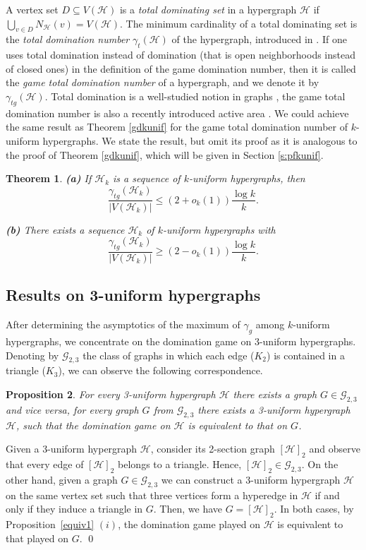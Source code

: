 \documentclass[12pt]{article}
\newtheorem{theorem}{Theorem}[section]
\newtheorem{prop}[theorem]{Proposition}
\newcommand\cG{{\mathcal G}}
\newcommand\cH{{\mathcal H}}
\begin{document}
\medskip

\noindent
A vertex set $D \subseteq V(\cH)$ is a \textit{total dominating set} in a hypergraph $\cH$ if $\bigcup_{v\in D} N_\cH(v)=V(\cH)$. The minimum cardinality of a total dominating set is the \textit{total domination number} $\gamma_t(\cH)$ of the hypergraph, introduced in \cite{BHT2014}. If one uses total domination instead of domination (that is open neighborhoods instead of closed ones) in the definition of the game domination number, then it is called the \textit{game total domination number} of a hypergraph, and we denote it by $\gamma_{tg}(\cH)$. Total domination is a well-studied  notion in graphs \cite{HY2013}, the game total domination number is also a recently introduced \cite{HKR2015} active area \cite{B2017, DH-2016, HKR2017}. We could achieve the same result as Theorem \ref{gdkunif} for the game total domination number of $k$-uniform hypergraphs. We state the result, but omit its proof as it is analogous to the proof of Theorem \ref{gdkunif}, which will be given in Section \ref{s:pfkunif}.

\begin{theorem}
\textbf{(a)} If $\cH_k$ is a sequence of $k$-uniform hypergraphs, then $$\frac{\gamma_{tg}(\cH_k)}{|V(\cH_k)|}\le (2+o_k(1))\frac{\log k}{k}.$$

\textbf{(b)} There exists a sequence $\cH_k$ of $k$-uniform hypergraphs with $$\frac{\gamma_{tg}(\cH_k)}{|V(\cH_k)|}\ge (2-o_k(1))\frac{\log k}{k}.$$
\end{theorem}

\subsection*{Results on 3-uniform hypergraphs}

After determining the asymptotics of the maximum of $\gamma_g$ among $k$-uniform hypergraphs, we concentrate on the domination game on 3-uniform hypergraphs. Denoting by $\cG_{2,3}$  the class of graphs in which each edge ($K_2$) is contained in a triangle ($K_3$), we can observe the following correspondence.

\begin{prop} \label{equiv2}
For every 3-uniform hypergraph $\cH$ there exists a graph $G \in \cG_{2,3}$ and vice versa, for every graph $G$ from $\cG_{2,3}$ there exists a 3-uniform hypergraph $\cH$, such that the domination game on $\cH$ is equivalent to that on $G$.
\end{prop}
\proof Given a 3-uniform hypergraph $\cH$, consider its 2-section graph $[\cH]_2$ and observe that every edge of  $[\cH]_2$ belongs to a triangle. Hence, $[\cH]_2 \in \cG_{2,3}$. On the other hand, given a graph  $G \in \cG_{2,3}$ we can construct a 3-uniform hypergraph $\cH$ on the same vertex set such that three vertices form a hyperedge in $\cH$ if and only if they induce a triangle in $G$. Then, we have $G=[\cH]_2$.  In both cases, by Proposition~\ref{equiv1} $(i)$, the domination game played on $\cH$ is equivalent to that played on $G$. \qed
\end{document}
